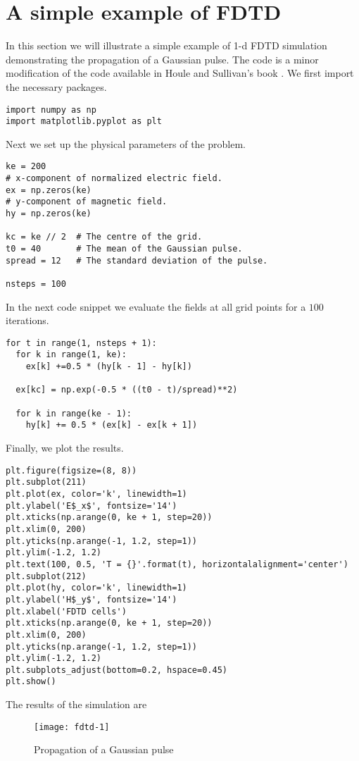 \documentclass[11pt]{article}
\numberwithin{equation}{section}
\begin{document}
\section{A simple example of FDTD}\label{s7}
In this section we will illustrate a simple example of 1-d FDTD simulation
demonstrating the propagation of a Gaussian pulse. The code is a minor 
modification of the code available in Houle and Sullivan's book 
\cite{sullivan2013electromagnetic}. We first import the necessary packages.
\begin{verbatim}
import numpy as np
import matplotlib.pyplot as plt
\end{verbatim}
Next we set up the physical parameters of the problem.
\begin{verbatim}
ke = 200
# x-component of normalized electric field.
ex = np.zeros(ke)
# y-component of magnetic field.
hy = np.zeros(ke)

kc = ke // 2  # The centre of the grid.
t0 = 40       # The mean of the Gaussian pulse.
spread = 12   # The standard deviation of the pulse.

nsteps = 100
\end{verbatim}
In the next code snippet we evaluate the fields at all grid points for a 
$100$ iterations.
\begin{verbatim}
for t in range(1, nsteps + 1):
  for k in range(1, ke):
    ex[k] +=0.5 * (hy[k - 1] - hy[k])

  ex[kc] = np.exp(-0.5 * ((t0 - t)/spread)**2)

  for k in range(ke - 1):
    hy[k] += 0.5 * (ex[k] - ex[k + 1])
\end{verbatim}
Finally, we plot the results.
\begin{verbatim}
plt.figure(figsize=(8, 8))
plt.subplot(211)
plt.plot(ex, color='k', linewidth=1)
plt.ylabel('E$_x$', fontsize='14')
plt.xticks(np.arange(0, ke + 1, step=20))
plt.xlim(0, 200)
plt.yticks(np.arange(-1, 1.2, step=1))
plt.ylim(-1.2, 1.2)
plt.text(100, 0.5, 'T = {}'.format(t), horizontalalignment='center')
plt.subplot(212)
plt.plot(hy, color='k', linewidth=1)
plt.ylabel('H$_y$', fontsize='14')
plt.xlabel('FDTD cells')
plt.xticks(np.arange(0, ke + 1, step=20))
plt.xlim(0, 200)
plt.yticks(np.arange(-1, 1.2, step=1))
plt.ylim(-1.2, 1.2)
plt.subplots_adjust(bottom=0.2, hspace=0.45)
plt.show()
\end{verbatim}
The results of the simulation are
\begin{figure}
\centering
\texttt{[image: fdtd-1]}
\caption{Propagation of a Gaussian pulse}\label{f2}
\end{figure}



\end{document}
